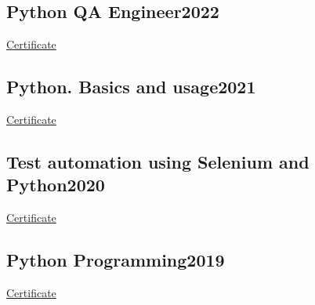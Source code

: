 \vspace*{10pt}

\subsection {{Python QA Engineer}\hfill 2022}
\vspace*{2pt}
\href{https://otus.ru/certificate/76b8da1ae26847fdab5ddfbc06c0ca59/en/}{Certificate}

\vspace*{8pt}

\subsection{{Python. Basics and usage}\hfill 2021}
\vspace*{2pt}
\href{https://stepik.org/cert/1234026/}{Certificate}

\vspace*{8pt}

\subsection{{Test automation using Selenium and Python}\hfill 2020}
\vspace*{2pt}
\href{https://stepik.org/cert/303434}{Certificate}

\vspace*{8pt}

\subsection{{Python Programming}\hfill 2019}
\vspace*{2pt}
\href{https://stepik.org/cert/268482}{Certificate}
